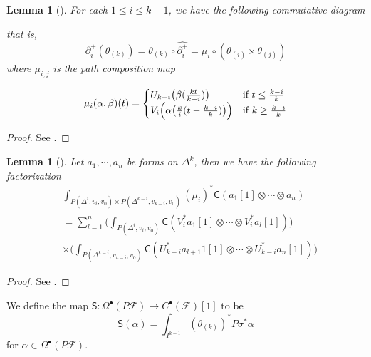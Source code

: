 \documentclass[12pt]{amsart}
\newtheorem{lem}[thm]{Lemma}
\theoremstyle{definition}
\theoremstyle{remark}
\numberwithin{equation}{section}
\newcommand{\del}{\partial}
\renewcommand{\del}{\partial}
\newcommand{\CF}{{\mathcal F}}
\newcommand{\1}{{\mathbb{1}}}
\newcommand{\bt}{\bullet}
\begin{document}
\begin{lem}[\cite{Igu09}]\label{a2}
    For each $1 \le i \le k - 1$, we have the following commutative diagram
    \begin{center}
    \end{center}
    that is,
$$
\del_i^+(\theta_{(k)}) = \theta_{(k)}\circ \widehat{\del_i^+} =\mu_{i} \circ (\theta_{(i)}\times \theta_{(j)})
$$
where $\mu_{i,j}$ is the path composition map

\begin{equation*}
    \mu_{i}(\alpha, \beta)(t)  =
    \begin{cases}
        U_{k-i}\big(\beta(\frac{kt}{k - i})\big) &\text{if $ t\le \frac{k-i}{k}$}\\
        V_i\Big(\alpha\big(\frac{k}{i}(t-\frac{k-i}{k})\big)\Big) &\text{if $  k \ge \frac{k-i}{k}$}
    \end{cases}
\end{equation*}
\end{lem}
\begin{proof}
    See \cite[Lemma 4.8]{Igu09}.
\end{proof}

\begin{lem}[\cite{AS12}]\label{a3}
    Let $a_1,\cdots, a_n$ be forms on $\Delta^k$, then we have the following factorization
    \begin{align*}
        &\int_{P(\Delta^{i}, v_{i}, v_0) \times P(\Delta^{k-i}, v_{k-i}, v_0) } (\mu_i)^*\mathsf{C}(a_1[1]\otimes \cdots \otimes a_n) \\
        &= \sum_{l = 1}^n \Big(\int_{P(\Delta^{i}, v_{i}, v_0) } \mathsf{C}(V_i^* a_1[1]\otimes \cdots \otimes V_i^* a_l[1]) \Big)\\
        &\times \Big(\int_{P(\Delta^{k-i}, v_{k-i}, v_0) } \mathsf{C}(U_{k-i}^* a_{l+1}1[1]\otimes \cdots \otimes U_{k-i}^* a_n[1]) \Big)
    \end{align*}
\end{lem}
\begin{proof}
    See \cite[Lemma 3.19]{AS12}.
\end{proof}
We define the map $\mathsf{S}:\Omega^{\bt}(P\CF)\to  C^{\bt}(\CF)[1]$ to be
\begin{equation*}
    \mathsf{S}(\alpha) = \int_{I^{k-1}} (\theta_{(k)})^*P\sigma^*\alpha
\end{equation*}
for $\alpha \in \Omega^{\bt}(P\CF)$.
\end{document}
